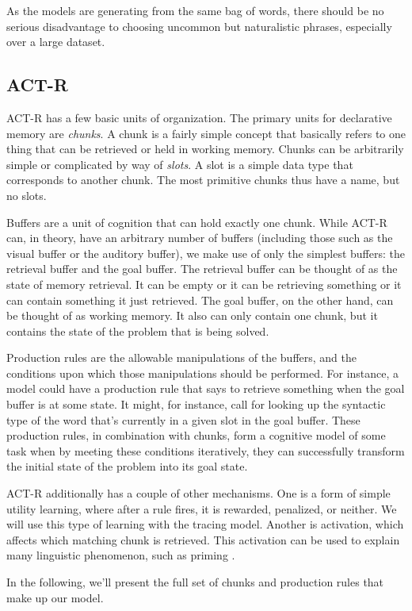 As the models are generating from the same bag of words, there should be no serious disadvantage to choosing uncommon but naturalistic phrases, especially over a large dataset. 

\subsection{ACT-R}
ACT-R has a few basic units of organization. The primary units for declarative memory are \textit{chunks}. A chunk is a fairly simple concept that basically refers to one thing that can be retrieved or held in working memory. Chunks can be arbitrarily simple or complicated by way of \textit{slots}. A slot is a simple data type that corresponds to another chunk. The most primitive chunks thus have a name, but no slots. 

Buffers are a unit of cognition that can hold exactly one chunk. While ACT-R can, in theory, have an arbitrary number of buffers (including those such as the visual buffer or the auditory buffer), we make use of only the simplest buffers: the retrieval buffer and the goal buffer. The retrieval buffer can be thought of as the state of memory retrieval. It can be empty or it can be retrieving something or it can contain something it just retrieved. The goal buffer, on the other hand, can be thought of as working memory. It also can only contain one chunk, but it contains the state of the problem that is being solved. 

Production rules are the allowable manipulations of the buffers, and the conditions upon which those manipulations should be performed. For instance, a model could have a production rule that says to retrieve something when the goal buffer is at some state. It might, for instance, call for looking up the syntactic type of the word that's currently in a given slot in the goal buffer. These production rules, in combination with chunks, form a cognitive model of some task when by meeting these conditions iteratively, they can successfully transform the initial state of the problem into its goal state. 

ACT-R additionally has a couple of other mechanisms. One is a form of simple utility learning, where after a rule fires, it is rewarded, penalized, or neither. We will use this type of learning with the tracing model. Another is activation, which affects which matching chunk is retrieved. This activation can be used to explain many linguistic phenomenon, such as priming \citep{priming} \citep{model}.  

In the following, we'll present the full set of chunks and production rules that make up our model. 
